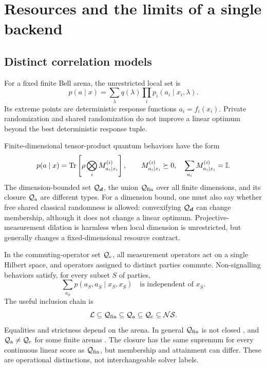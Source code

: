 \section{Resources and the limits of a single backend}
\label{sec:resources}

\subsection{Distinct correlation models}
For a fixed finite Bell arena, the unrestricted local set is
\begin{equation}
 p(a\mid x)=\sum_\lambda q(\lambda)\prod_i p_i(a_i\mid x_i,\lambda).
 \label{eq:local}
\end{equation}
Its extreme points are deterministic response functions $a_i=f_i(x_i)$.
Private randomization and shared randomization do not improve a linear optimum
beyond the best deterministic response tuple.

Finite-dimensional tensor-product quantum behaviors have the form
\begin{equation}
 p(a\mid x)=\operatorname{Tr}\left[\rho\bigotimes_i M^{(i)}_{a_i\mid x_i}\right],\qquad
 M^{(i)}_{a_i\mid x_i}\succeq0,\quad
 \sum_{a_i}M^{(i)}_{a_i\mid x_i}=\mathbb I.
 \label{eq:quantum}
\end{equation}
The dimension-bounded set $\mathcal Q_{\boldsymbol d}$, the union $\mathcal Q_{\rm fin}$ over
all finite dimensions, and its closure $\mathcal Q_{\rm a}$ are different types.
For a dimension bound, one must also say whether free shared classical
randomness is allowed: convexifying $\mathcal Q_{\boldsymbol d}$ can change membership,
although it does not change a linear optimum. Projective-measurement dilation
is harmless when local dimension is unrestricted, but generally changes a
fixed-dimensional resource contract.

In the commuting-operator set $\mathcal Q_{\rm c}$, all measurement operators act on a
single Hilbert space, and operators assigned to distinct parties commute.
Non-signalling behaviors satisfy, for every subset $S$ of parties,
\begin{equation}
 \sum_{a_{\bar S}}p(a_S,a_{\bar S}\mid x_S,x_{\bar S})
 \quad\text{is independent of }x_{\bar S}.
 \label{eq:ns}
\end{equation}
The useful inclusion chain is
\begin{equation}
 \mathcal L\subseteq\mathcal Q_{\rm fin}\subseteq\mathcal Q_{\rm a}
 \subseteq\mathcal Q_{\rm c}\subseteq\mathcal{NS}.
 \label{eq:chain}
\end{equation}
Equalities and strictness depend on the arena. In general $\mathcal Q_{\rm fin}$ is not
closed \cite{slofstra2019}, and $\mathcal Q_{\rm a}\ne\mathcal Q_{\rm c}$ for some finite
arenas \cite{ji2020}. The closure has the same supremum for every continuous
linear score as $\mathcal Q_{\rm fin}$, but membership and attainment can differ.
These are operational distinctions, not interchangeable solver labels.


